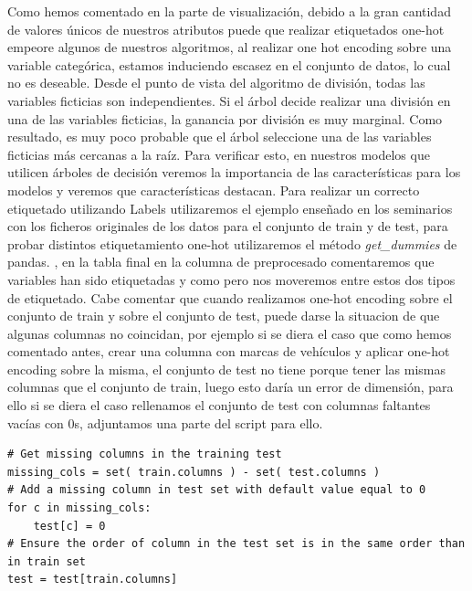 \documentclass[12pt,twoside]{report}
\begin{document}
Como hemos comentado en la parte de visualización, debido a la gran cantidad de valores únicos de nuestros atributos puede que realizar etiquetados one-hot empeore algunos de nuestros algoritmos, al realizar one hot encoding sobre una variable categórica, estamos induciendo escasez en el conjunto de datos, lo cual no es deseable.
Desde el punto de vista del algoritmo de división, todas las variables ficticias son independientes. Si el árbol decide realizar una división en una de las variables ficticias, la ganancia por división es muy marginal. Como resultado, es muy poco probable que el árbol seleccione una de las variables ficticias más cercanas a la raíz. Para verificar esto, en nuestros modelos que utilicen árboles de decisión veremos la importancia de las características para los modelos y veremos que características destacan. Para realizar un correcto etiquetado utilizando Labels utilizaremos el ejemplo enseñado en los seminarios con los ficheros originales de los datos para el conjunto de train y de test, para probar distintos etiquetamiento one-hot utilizaremos el método \textit{get\_dummies} de pandas. \cite{getdummies}, en la tabla final en la columna de preprocesado comentaremos que variables han sido etiquetadas y como pero nos moveremos entre estos dos tipos de etiquetado. Cabe comentar que cuando realizamos one-hot encoding sobre el conjunto de train y sobre el conjunto de test, puede darse la situacion de que algunas columnas no coincidan, por ejemplo si se diera el caso que como hemos comentado antes, crear una columna con marcas de vehículos y aplicar one-hot encoding sobre la misma, el conjunto de test no tiene porque tener las mismas columnas que el conjunto de train, luego esto daría un error de dimensión, para ello si se diera el caso rellenamos el conjunto de test con columnas faltantes vacías con 0s, adjuntamos una parte del script para ello.

\begin{lstlisting}
# Get missing columns in the training test
missing_cols = set( train.columns ) - set( test.columns )
# Add a missing column in test set with default value equal to 0
for c in missing_cols:
    test[c] = 0
# Ensure the order of column in the test set is in the same order than in train set
test = test[train.columns]
\end{lstlisting}
\end{document}
